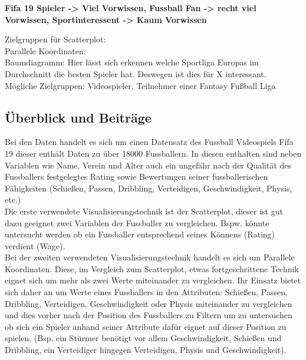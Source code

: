 \documentclass[usegeometry=true]{scrartcl}
\begin{document}
\textbf{Fifa 19 Spieler -> Viel Vorwissen, Fussball Fan -> recht viel Vorwissen, Sportinteressent -> Kaum Vorwissen}

Zielgruppen für Scatterplot:\\
Parallele Koordinaten:\\
Baumdiagramm: Hier lässt sich erkennen welche Sportliga Europas im Durchschnitt die besten Spieler hat. Deswegen ist dies für X interessant.\\
Mögliche Zielgruppen: Videospieler, Teilnehmer einer Fantasy Fußball Liga
\subsection{Überblick und Beiträge}



Bei den Daten handelt es sich um einen Datensatz des Fussball Videospiels Fifa 19 dieser enthält Daten zu über 18000 Fussballern. In diesen enthalten sind neben Variablen wie Name, Verein und Alter auch ein ungefähr nach der Qualität des Fussballers festgelegtes Rating sowie Bewertungen seiner fussballerischen Fähigkeiten (Schießen, Passen, Dribbling, Verteidigen, Geschwindigkeit, Physis, etc.)\\

Die erste verwendete Visualisierungstechnik ist der Scatterplot, dieser ist gut dazu geeignet zwei Variablen der Fussballer zu vergleichen. Bspw. könnte untersucht werden ob ein Fussballer entsprechend seines Könnens (Rating) verdient (Wage). \\

Bei der zweiten verwendeten Visualisierungstechnik handelt es sich um Parallele Koordinaten. Diese, im Vergleich zum Scatterplot, etwas fortgeschrittene Technik eignet sich um mehr als zwei Werte miteinander zu vergleichen. Ihr Einsatz bietet sich daher an um Werte eines Fussballers in den Attributen: Schießen, Passen, Dribbling, Verteidigen, Geschwindigkeit oder Physis miteinander zu vergleichen und dies vorher nach der Position des Fussballers zu Filtern um zu untersuchen ob sich ein Spieler anhand seiner Attribute dafür eignet auf dieser Position zu spielen. (Bsp. ein Stürmer benötigt vor allem Geschwindigkeit, Schießen und Dribbling, ein Verteidiger hingegen Verteidigen, Physis und Geschwindigkeit).\\
\end{document}
